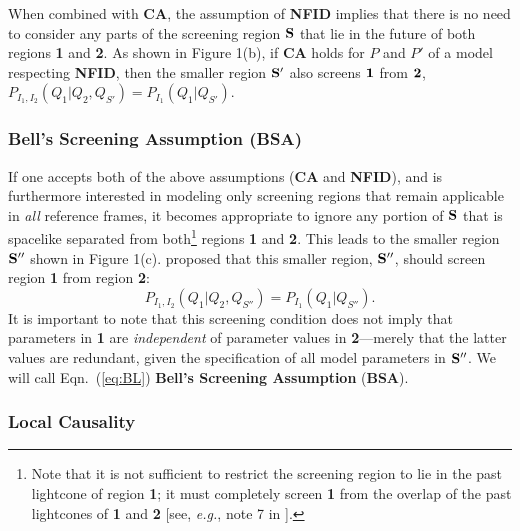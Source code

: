 \documentclass[onecolumn, nofootinbib, 12pt]{revtex4-1}
\newcommand{\eq}[1]{{Eqn.~(\ref{#1})}}
\begin{document}
When combined with {\bf CA}, the assumption of {\bf NFID} implies that there is no need to consider any parts of the screening region $\bf{S}$ that lie in the future of both regions {\bf 1} and {\bf 2}.  As shown in Figure 1(b), if {\bf CA} holds for $P$ and $P'$ of a model respecting {\bf NFID}, then the smaller region ${\bf S'}$ also screens ${\bf 1}$ from ${\bf 2}$, $P_{I_1,I_2}(Q_1|Q_2,Q_{S'}) = P_{I_1}(Q_1|Q_{S'})$.  


\subsubsection{Bell's Screening Assumption {\rm ({\bf BSA})}}

If one accepts both of the above assumptions ({\bf CA} and {\bf NFID}), and is furthermore interested in modeling only screening regions that remain applicable in \emph{all} reference frames, it becomes appropriate to ignore any portion of $\bf{S}$ that is spacelike separated from both\footnote{Note that it is not sufficient to restrict the screening region to lie in the past lightcone of region {\bf 1}; it must completely screen {\bf 1} from the overlap of the past lightcones of {\bf 1} and {\bf 2} [see, \emph{e.g.}, note 7 in \textcite{bell1986}].} regions {\bf 1} and {\bf 2}.  This leads to the smaller region $\bf{S''}$ shown in Figure 1(c).  \textcite{bell1990} proposed that this smaller region, $\bf{S''}$, should screen region {\bf 1} from region {\bf 2}:
\begin{equation}
\label{eq:BL}
P_{I_1,I_2}(Q_1|Q_2,Q_{S''}) = P_{I_1}(Q_1|Q_{S''}).
\end{equation}
It is important to note that this screening condition does not imply that parameters in {\bf 1} are {\em independent} of parameter values in {\bf 2}---merely that the latter values are redundant, given the specification of all model parameters in $\bf{S''}$.  We will call \eq{eq:BL} {\bf Bell's Screening Assumption} ({\bf BSA}).

\subsubsection{Local Causality}
\end{document}
